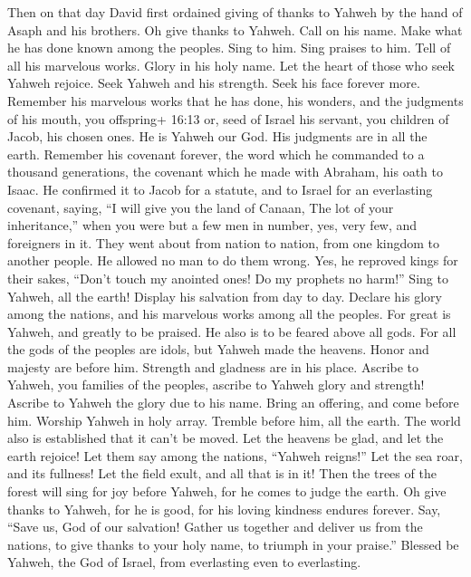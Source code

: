  Then on that day David first ordained giving of thanks to
Yahweh by the hand of Asaph and his brothers.  Oh give
thanks to Yahweh. Call on his name. Make what he has done known among
the peoples.  Sing to him. Sing praises to him. Tell of all
his marvelous works.  Glory in his holy name. Let the heart
of those who seek Yahweh rejoice.  Seek Yahweh and his
strength. Seek his face forever more.  Remember his
marvelous works that he has done, his wonders, and the judgments of his
mouth,  you offspring+ 16:13 or, seed of Israel his
servant, you children of Jacob, his chosen ones.  He is
Yahweh our God. His judgments are in all the earth. 
Remember his covenant forever, the word which he commanded to a thousand
generations,  the covenant which he made with Abraham, his
oath to Isaac.  He confirmed it to Jacob for a statute, and
to Israel for an everlasting covenant,  saying, ``I will
give you the land of Canaan, The lot of your inheritance,''
 when you were but a few men in number, yes, very few, and
foreigners in it.  They went about from nation to nation,
from one kingdom to another people.  He allowed no man to
do them wrong. Yes, he reproved kings for their sakes, 
``Don't touch my anointed ones! Do my prophets no harm!'' 
Sing to Yahweh, all the earth! Display his salvation from day to day.
 Declare his glory among the nations, and his marvelous
works among all the peoples.  For great is Yahweh, and
greatly to be praised. He also is to be feared above all gods.
 For all the gods of the peoples are idols, but Yahweh made
the heavens.  Honor and majesty are before him. Strength
and gladness are in his place.  Ascribe to Yahweh, you
families of the peoples, ascribe to Yahweh glory and strength!
 Ascribe to Yahweh the glory due to his name. Bring an
offering, and come before him. Worship Yahweh in holy array.
 Tremble before him, all the earth. The world also is
established that it can't be moved.  Let the heavens be
glad, and let the earth rejoice! Let them say among the nations,
``Yahweh reigns!''  Let the sea roar, and its fullness! Let
the field exult, and all that is in it!  Then the trees of
the forest will sing for joy before Yahweh, for he comes to judge the
earth.  Oh give thanks to Yahweh, for he is good, for his
loving kindness endures forever.  Say, ``Save us, God of
our salvation! Gather us together and deliver us from the nations, to
give thanks to your holy name, to triumph in your praise.''
 Blessed be Yahweh, the God of Israel, from everlasting
even to everlasting.

